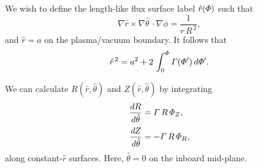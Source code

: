 \documentclass[notitlepage,12pt]{article}
\begin{document}
We wish to define the length-like flux surface label $\hat{r}({\mit\Phi})$ such that
\begin{equation}
\nabla \hat{r}\times\nabla\hat{\theta}\,\cdot\nabla\phi = \frac{1}{r\,R^{\,2}},
\end{equation}
and $\hat{r}=a$ on the plasma/vacuum boundary.
It follows that
\begin{equation}
\hat{r}^{\,2}= a^{2} + 2\,\int_0^{{\mit\Phi}}{\mit\Gamma}({\mit\Phi}')\,d{\mit\Phi}'.
\end{equation}


We can calculate $R(\hat{r},\hat{\theta})$ and $Z(\hat{r},\hat{\theta})$ by integrating 
\begin{align}
\frac{dR}{d\hat{\theta}}&={\mit\Gamma}\,R\,{\mit\Phi}_Z,\\[0.5ex]
\frac{dZ}{d\hat{\theta}} &=-{\mit\Gamma}\,R\,{\mit\Phi}_R,
\end{align}
along constant-$\hat{r}$ surfaces. Here, $\hat{\theta}=0$ on the inboard mid-plane. 
\end{document}
